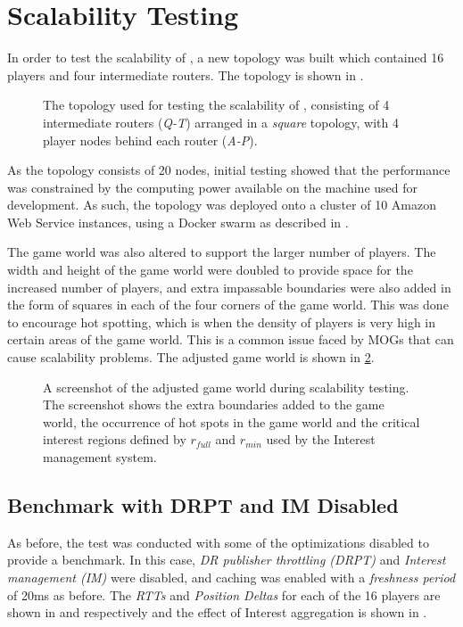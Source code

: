 \section{Scalability Testing}\label{sec:eval:scalability}
In order to test the scalability of \game{}, a new topology was built which contained 16 players and four intermediate routers. The topology is shown in .

\begin{figure}[H]
    \centering
    \caption{The topology used for testing the scalability of \game{}, consisting of 4 intermediate routers (\textit{Q-T}) arranged in a \textit{square} topology, with 4 player nodes behind each router (\textit{A-P}).}
    \label{fig:eval:scalability-topology}
\end{figure}

As the topology consists of 20 nodes, initial testing showed that the performance was constrained by the computing power available on the machine used for development. As such, the topology was deployed onto a cluster of 10 Amazon Web Service instances, using a Docker swarm as described in .

The game world was also altered to support the larger number of players. The width and height of the game world were doubled to provide space for the increased number of players, and extra impassable boundaries were also added in the form of squares in each of the four corners of the game world. This was done to encourage hot spotting, which is when the density of players is very high in certain areas of the game world. This is a common issue faced by MOGs that can cause scalability problems. The adjusted game world is shown in \ref{fig:eval:hotspotting}.

\begin{figure}[H]
    \centering
    \caption{A screenshot of the adjusted game world during scalability testing. The screenshot shows the extra boundaries added to the game world, the occurrence of hot spots in the game world and the critical interest regions defined by $r_{full}$ and $r_{min}$ used by the Interest management system.}
    \label{fig:eval:hotspotting}
\end{figure}


\subsection{Benchmark with DRPT and IM Disabled}
As before, the test was conducted with some of the optimizations disabled to provide a benchmark. In this case, \textit{DR publisher throttling (DRPT)} and \textit{Interest management (IM)} were disabled, and caching was enabled with a \textit{freshness period} of 20ms as before. The \textit{RTTs} and \textit{Position Deltas} for each of the 16 players are shown in  and  respectively and the effect of Interest aggregation is shown in .

